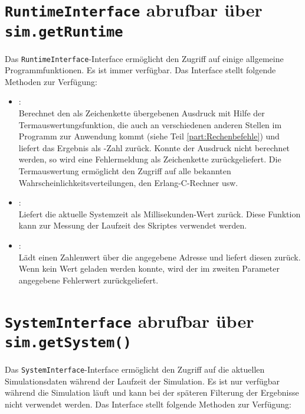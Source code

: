 \chapter{\texttt{RuntimeInterface} abrufbar über \texttt{sim.getRuntime}}

Das \texttt{RuntimeInterface}-Interface ermöglicht den Zugriff auf einige allgemeine Programmfunktionen.
Es ist immer verfügbar. Das Interface stellt folgende Methoden zur Verfügung:

\begin{itemize}

\item
{}:\\
Berechnet den als Zeichenkette übergebenen Ausdruck mit Hilfe der Termauswertungsfunktion, die
auch an verschiedenen anderen Stellen im Programm zur Anwendung kommt (siehe Teil \ref{part:Rechenbefehle}) und liefert das Ergebnis
als -Zahl zurück. Konnte der Ausdruck nicht berechnet werden, so wird eine Fehlermeldung als
Zeichenkette zurückgeliefert. Die Termauswertung ermöglicht den Zugriff auf alle bekannten
Wahrscheinlichkeitsverteilungen, den Erlang-C-Rechner usw.

\item
{}:\\
Liefert die aktuelle Systemzeit als Millisekunden-Wert zurück. Diese Funktion kann zur Messung der
Laufzeit des Skriptes verwendet werden.

\item
{}:\\
Lädt einen Zahlenwert über die angegebene Adresse und liefert diesen zurück.
Wenn kein Wert geladen werden konnte, wird der im zweiten Parameter angegebene
Fehlerwert zurückgeliefert.
	
\end{itemize}



\chapter{\texttt{SystemInterface} abrufbar über \texttt{sim.getSystem()}}

Das \texttt{SystemInterface}-Interface ermöglicht den Zugriff auf die aktuellen Simulationsdaten während
der Laufzeit der Simulation. Es ist nur verfügbar während die Simulation läuft und kann bei der
späteren Filterung der Ergebnisse nicht verwendet werden. Das Interface stellt folgende Methoden zur Verfügung:

